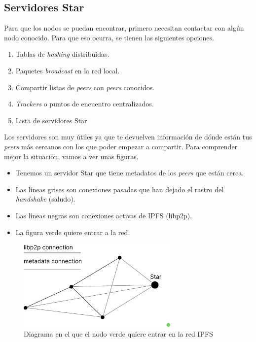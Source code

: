 \subsection{Servidores Star}
Para que los nodos se puedan encontrar, primero necesitan contactar con algún nodo conocido.
Para que eso ocurra, se tienen las siguientes opciones.
\begin{enumerate}
    \item Tablas de \textit{hashing} distribuidas.
    \item Paquetes \textit{broadcast} en la red local.
    \item Compartir listas de \textit{peers} con \textit{peers} conocidos.
    \item \textit{Trackers} o puntos de encuentro centralizados.
    \item Lista de servidores Star
\end{enumerate}
Los servidores son muy útiles ya que te devuelven información de dónde están tus \textit{peers} más cercanos con los que poder empezar a compartir.
Para comprender mejor la situación, vamos a ver unas figuras.
\begin{itemize}
    \item Tenemos un servidor Star que tiene metadatos de los \textit{peers} que están cerca.
    \item Las líneas grises son conexiones pasadas que han dejado el rastro del \textit{handshake} (saludo).
    \item Las líneas negras son conexiones activas de IPFS (libp2p).
    \item La figura verde quiere entrar a la red.
\end{itemize}
\begin{figure}[h!]
    \centering
    \includegraphics[width=0.7\textwidth]{Figures/Green wants to join(2).png}
    \caption{Diagrama en el que el nodo verde quiere entrar en la red IPFS}
    \label{fg:scanning_ipfs}
\end{figure}
